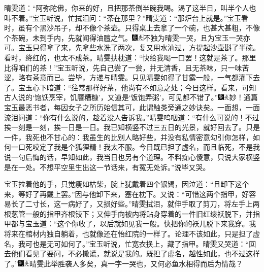 晴雯道：“阿弥陀佛，你来的好，且把那茶倒半碗我喝。渴了这半日，叫半个人也叫不着。”宝玉听说，忙拭泪问：“茶在那里？”晴雯道：“那炉台上就是。”宝玉看时，虽有个黑沙吊子，却不像个茶壶。只得桌上去拿了一个碗，也甚大甚粗，不像个茶碗，未到手内，先就闻得油膻之气。{\includegraphics[width=3mm]{../Images/00004}\includegraphics[width=3mm]{../Images/00012}\footnotesize \kaishu 不独为晴雯一哭，且为宝玉一哭亦可。}宝玉只得拿了来，先拿些水洗了两次，复又用水汕过，方提起沙壶斟了半碗。看时，绛红的，也太不成茶。晴雯扶枕道：“快给我喝一口罢！这就是茶了。那里比得咱们的茶！”宝玉听说，先自己尝了一尝，并无清香，且无茶味，只一味苦涩，略有茶意而已。尝毕，方递与晴雯。只见晴雯如得了甘露一般，一气都灌下去了。宝玉心下暗道：“往常那样好茶，他尚有不如意之处；今日这样。看来，可知古人说的‘饱饫烹宰，饥餍糟糠’，又道是‘饭饱弄粥’，可见都不错了。”{\includegraphics[width=3mm]{../Images/00004}\includegraphics[width=3mm]{../Images/00012}\footnotesize \kaishu 妙！通篇宝玉最恶书者，每因女子之所历始信其可，此谓触类旁通之妙诀矣。}一面想，一面流泪问道：“你有什么说的，趁着没人告诉我。”晴雯呜咽道：“有什么可说的！不过挨一刻是一刻，挨一日是一日。我已知横竖不过三五日的光景，就好回去了。只是一件，我死也不甘心的：我虽生的比别人略好些，并没有私情密意勾引你怎样，如何一口死咬定了我是个狐狸精！我太不服。今日既已担了虚名，而且临死，不是我说一句后悔的话，早知如此，我当日也另有个道理。不料痴心傻意，只说大家横竖是在一处。不想平空里生出这一节话来，有冤无处诉。”说毕又哭。

宝玉拉着他的手，只觉瘦如枯柴，腕上犹戴着四个银镯，因泣道：“且卸下这个来，等好了再戴上罢。”因与他卸下来，塞在枕下。又说：“可惜这两个指甲，好容易长了二寸长，这一病好了，又损好些。”晴雯拭泪，就伸手取了剪刀，将左手上两根葱管一般的指甲齐根铰下；又伸手向被内将贴身穿着的一件旧红绫袄脱下，并指甲都与宝玉道：“这个你收了，以后就如见我一般。快把你的袄儿脱下来我穿。我将来在棺材内独自躺着，也就像还在怡红院的一样了。论理不该如此，只是担了虚名，我可也是无可如何了。”宝玉听说，忙宽衣换上，藏了指甲。晴雯又哭道：“回去他们看见了要问，不必撒谎，就说是我的。既担了虚名，越性如此，也不过这样了。”{\includegraphics[width=3mm]{../Images/00007}\includegraphics[width=3mm]{../Images/00012}\footnotesize \kaishu 晴雯此举胜袭人多矣，真一字一哭也，又何必鱼水相得而后为情哉？}

